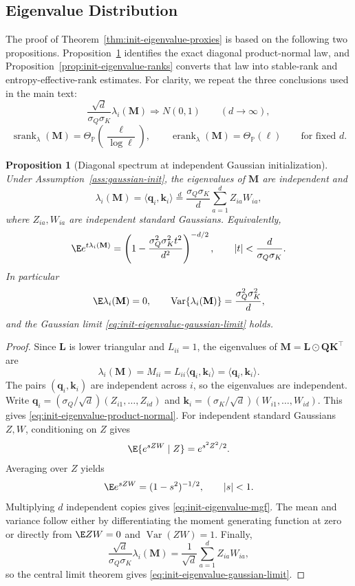 \documentclass{article}
\newcommand{\Prob}{\mathbb{P}}
\newcommand{\srank}{\operatorname{srank}}
\newcommand{\erank}{\operatorname{erank}}
\newcommand{\weak}{\Rightarrow}
\newcommand{\hadamard}{\mathbin{\odot}}
\newcommand{\bM}{\mathbf{M}}
\newcommand{\bL}{\mathbf{L}}
\newcommand{\bQ}{\mathbf{Q}}
\newcommand{\bK}{\mathbf{K}}
\newtheorem{proposition}[theorem]{Proposition}
\theoremstyle{definition}
\theoremstyle{remark}
\begin{document}
\subsection{Eigenvalue Distribution}
The proof of Theorem~\ref{thm:init-eigenvalue-proxies} is based on the following
two propositions.  Proposition~\ref{prop:init-eigenvalues} identifies the exact
diagonal product-normal law, and
Proposition~\ref{prop:init-eigenvalue-ranks} converts that law into
stable-rank and entropy-effective-rank estimates.  For clarity, we repeat the
three conclusions used in the main text:
\[
    \frac{\sqrt d}{\sigma_Q\sigma_K}\lambda_i(\bM)
    \weak N(0,1)
    \qquad (d\to\infty),
\]
\[
    \srank_\lambda(\bM)=\Theta_{\Prob}\left(\frac{\ell}{\log\ell}\right),
    \qquad
    \erank_\lambda(\bM)
    =
    \Theta_{\Prob}(\ell)
    \qquad \text{for fixed }d.
\]

\begin{proposition}[Diagonal spectrum at independent Gaussian initialization]
Under Assumption~\ref{ass:gaussian-init}, the eigenvalues of $\bM$ are
independent and
\begin{equation}
    \lambda_i(\bM)
    =
    \langle \mathbf q_i,\mathbf k_i\rangle
    \stackrel{d}{=}
    \frac{\sigma_Q\sigma_K}{d}
    \sum_{a=1}^d Z_{ia}W_{ia},
    \label{eq:init-eigenvalue-product-normal}
\end{equation}
where $Z_{ia},W_{ia}$ are independent standard Gaussians.  Equivalently,
\begin{equation}
    \E e^{t\lambda_i(\bM)}
    =
    \left(
        1-\frac{\sigma_Q^2\sigma_K^2t^2}{d^2}
    \right)^{-d/2},
    \qquad |t|<\frac{d}{\sigma_Q\sigma_K}.
    \label{eq:init-eigenvalue-mgf}
\end{equation}
In particular
\[
    \E\lambda_i(\bM)=0,\qquad
    \operatorname{Var}\{\lambda_i(\bM)\}
    =
    \frac{\sigma_Q^2\sigma_K^2}{d},
\]
and the Gaussian limit \eqref{eq:init-eigenvalue-gaussian-limit} holds.
\label{prop:init-eigenvalues}
\end{proposition}

\begin{proof}
Since $\bL$ is lower triangular and $L_{ii}=1$, the eigenvalues of
$\bM=\bL\hadamard\bQ\bK^\top$ are
\[
    \lambda_i(\bM)=M_{ii}=L_{ii}\langle \mathbf q_i,\mathbf k_i\rangle
    =
    \langle \mathbf q_i,\mathbf k_i\rangle.
\]
The pairs $(\mathbf q_i,\mathbf k_i)$ are independent across $i$, so the
eigenvalues are independent.  Write
$\mathbf q_i=(\sigma_Q/\sqrt d)(Z_{i1},\ldots,Z_{id})$ and
$\mathbf k_i=(\sigma_K/\sqrt d)(W_{i1},\ldots,W_{id})$.  This gives
\eqref{eq:init-eigenvalue-product-normal}.  For independent standard Gaussians
$Z,W$, conditioning on $Z$ gives
\[
    \E\{e^{sZW}\mid Z\}=e^{s^2Z^2/2}.
\]
Averaging over $Z$ yields
\[
    \E e^{sZW}=(1-s^2)^{-1/2},\qquad |s|<1.
\]
Multiplying $d$ independent copies gives \eqref{eq:init-eigenvalue-mgf}.  The
mean and variance follow either by differentiating the moment generating
function at zero or directly from
$\E ZW=0$ and $\operatorname{Var}(ZW)=1$.  Finally,
\[
    \frac{\sqrt d}{\sigma_Q\sigma_K}\lambda_i(\bM)
    =
    \frac{1}{\sqrt d}\sum_{a=1}^d Z_{ia}W_{ia},
\]
so the central limit theorem gives \eqref{eq:init-eigenvalue-gaussian-limit}.
\end{proof}
\end{document}
